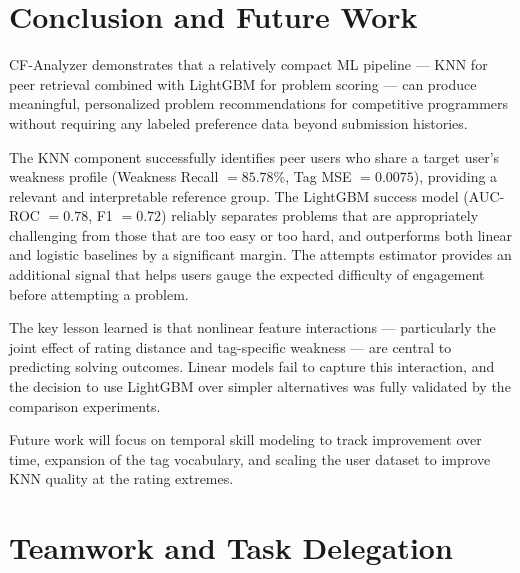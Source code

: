 \documentclass[12pt,a4paper]{article}
\begin{document}
\section{Conclusion and Future Work}

CF-Analyzer demonstrates that a relatively compact ML pipeline --- KNN for peer
retrieval combined with LightGBM for problem scoring --- can produce meaningful,
personalized problem recommendations for competitive programmers without requiring
any labeled preference data beyond submission histories.

The KNN component successfully identifies peer users who share a target user's
weakness profile (Weakness Recall $= 85.78\%$, Tag MSE $= 0.0075$), providing a
relevant and interpretable reference group. The LightGBM success model
(AUC-ROC $= 0.78$, F1 $= 0.72$) reliably separates problems that are
appropriately challenging from those that are too easy or too hard, and
outperforms both linear and logistic baselines by a significant margin. The
attempts estimator provides an additional signal that helps users gauge the
expected difficulty of engagement before attempting a problem.

The key lesson learned is that nonlinear feature interactions --- particularly
the joint effect of rating distance and tag-specific weakness --- are central to
predicting solving outcomes. Linear models fail to capture this interaction,
and the decision to use LightGBM over simpler alternatives was fully validated
by the comparison experiments.

Future work will focus on temporal skill modeling to track improvement over time,
expansion of the tag vocabulary, and scaling the user dataset to improve KNN
quality at the rating extremes.

 
\section{Teamwork and Task Delegation}
 
\end{document}
